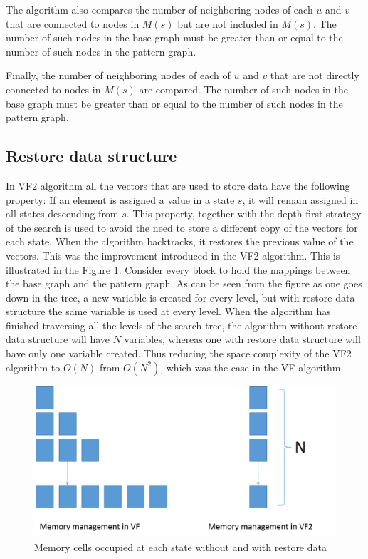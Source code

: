 The algorithm also compares the number of neighboring nodes of each $u$ and $v$ that are connected to nodes in $M(s)$ but are not
included in $M(s)$. The number of such nodes in the base graph must be greater than or equal to the number of such nodes in the pattern graph.

Finally, the number of neighboring nodes of each of $u$ and $v$ that are not directly connected to nodes in $M(s)$ are compared. The number of 
such nodes in the base graph must be greater than or equal to the number of such nodes in the pattern graph.

\subsection{Restore data structure}
In VF2 algorithm all the vectors that are used to store data have the following property: If an element is assigned a value in a state $s$, it will remain assigned in all states descending from $s$. This property, together with the depth-first strategy of the search is used to avoid the need to store a different copy of the vectors for each state. When the algorithm backtracks, it restores the previous value of the vectors. This was the improvement introduced in the VF2 algorithm. This is illustrated in the Figure \ref{fig:memManagement}. Consider every block to hold the mappings between the base graph and the pattern graph. As can be seen from the figure as one goes down in the tree, a new variable is created for every level, but with restore data structure the same variable is used at every level. When the algorithm has finished traversing all the levels of the search tree, the algorithm without restore data structure will have $N$ variables, whereas one with restore data structure will have only one variable created. Thus reducing the space complexity of the VF2 algorithm to $O(N)$ from $O(N^2)$, which was the case in the VF algorithm.

\begin{figure}[!ht]
\includegraphics[scale=0.5]{./pics/memManagement.png}
\caption{Memory cells occupied at each state without and with restore data}
\label{fig:memManagement}
\centering
\end{figure}


